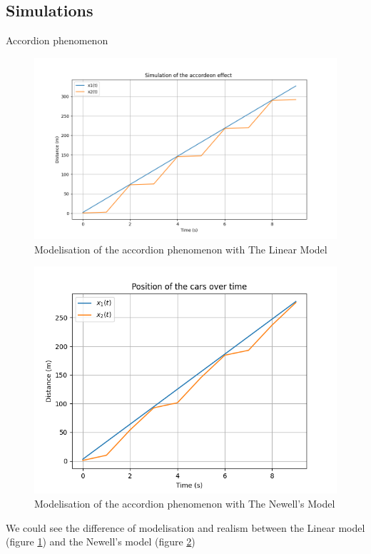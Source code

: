 \documentclass{beamer}
\begin{document}
\subsection{Simulations}
\begin{frame}{Accordion phenomenon}
	\begin{minipage}{0.48\textwidth}
		\centering
		\begin{figure}
			\includegraphics[width=\textwidth]{Accordeon1.png}
			\caption{Modelisation of the accordion phenomenon with The Linear Model}
			\label{fig:AL}
		\end{figure}
	\end{minipage}\hfill
	\begin{minipage}{0.48\textwidth}
		\centering
		\begin{figure}
			\includegraphics[width=\textwidth]{1W2_Accord.png}
			\caption{Modelisation of the accordion phenomenon with The Newell's Model}
			\label{fig:AN}
		\end{figure}
	\end{minipage}
	\begin{block}{}
		We could see the difference of modelisation and realism between the Linear model (figure \ref{fig:AL}) and the Newell's model (figure \ref{fig:AN})
	\end{block}
\end{frame}
\end{document}
